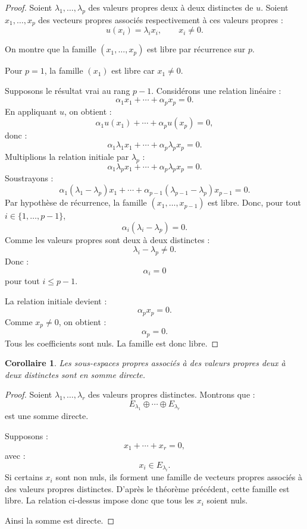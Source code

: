 \documentclass[11pt,a4paper]{article}
\newtheorem{corollaire}[prop]{Corollaire}
\begin{document}
\begin{proof}
Soient \(\lambda_1,\dots,\lambda_p\) des valeurs propres deux à deux distinctes de \(u\).  
Soient \(x_1,\dots,x_p\) des vecteurs propres associés respectivement à ces valeurs propres :
\[
u(x_i)=\lambda_i x_i,
\qquad
x_i\neq0.
\]

On montre que la famille \((x_1,\dots,x_p)\) est libre par récurrence sur \(p\).

Pour \(p=1\), la famille \((x_1)\) est libre car \(x_1\neq0\).

Supposons le résultat vrai au rang \(p-1\).  
Considérons une relation linéaire :
\[
\alpha_1x_1+\cdots+\alpha_px_p=0.
\]
En appliquant \(u\), on obtient :
\[
\alpha_1u(x_1)+\cdots+\alpha_pu(x_p)=0,
\]
donc :
\[
\alpha_1\lambda_1x_1+\cdots+\alpha_p\lambda_px_p=0.
\]
Multiplions la relation initiale par \(\lambda_p\) :
\[
\alpha_1\lambda_px_1+\cdots+\alpha_p\lambda_px_p=0.
\]
Soustrayons :
\[
\alpha_1(\lambda_1-\lambda_p)x_1
+\cdots+
\alpha_{p-1}(\lambda_{p-1}-\lambda_p)x_{p-1}=0.
\]
Par hypothèse de récurrence, la famille \((x_1,\dots,x_{p-1})\) est libre.  
Donc, pour tout \(i\in\{1,\dots,p-1\}\),
\[
\alpha_i(\lambda_i-\lambda_p)=0.
\]
Comme les valeurs propres sont deux à deux distinctes :
\[
\lambda_i-\lambda_p\neq0.
\]
Donc :
\[
\alpha_i=0
\]
pour tout \(i\leq p-1\).

La relation initiale devient :
\[
\alpha_px_p=0.
\]
Comme \(x_p\neq0\), on obtient :
\[
\alpha_p=0.
\]
Tous les coefficients sont nuls.  
La famille est donc libre.
\end{proof}

\begin{corollaire}
Les sous-espaces propres associés à des valeurs propres deux à deux distinctes sont en somme directe.
\end{corollaire}

\begin{proof}
Soient \(\lambda_1,\dots,\lambda_r\) des valeurs propres distinctes.  
Montrons que :
\[
E_{\lambda_1}\oplus\cdots\oplus E_{\lambda_r}
\]
est une somme directe.

Supposons :
\[
x_1+\cdots+x_r=0,
\]
avec :
\[
x_i\in E_{\lambda_i}.
\]
Si certains \(x_i\) sont non nuls, ils forment une famille de vecteurs propres associés à des valeurs propres distinctes.  
D'après le théorème précédent, cette famille est libre.  
La relation ci-dessus impose donc que tous les \(x_i\) soient nuls.

Ainsi la somme est directe.
\end{proof}
\end{document}
